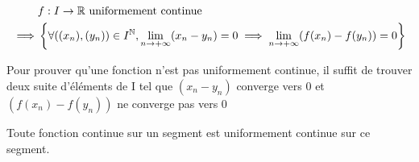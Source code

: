 \begin{prp}
\begin{align*}
            &f : I \to \mathbb{R} \text{ uniformement continue } \\
\implies    &\left \{ \forall ((x_n), (y_n)) \in I^{\mathbb{N}}, \lim\limits_{n \to +\infty} (x_n - y_n) = 0
            \implies \lim\limits_{n \to +\infty} (f(x_n) - f(y_n)) = 0 \right \}
\end{align*}
\end{prp}

\begin{rem}
Pour prouver qu'une fonction n'est pas uniformement continue,
il suffit de trouver deux suite d'éléments de I tel que
$(x_n - y_n)$ converge vers 0 et $(f(x_n) - f(y_n))$ ne converge
pas vers 0
\end{rem}

\begin{thm}[de Heine]
Toute fonction continue sur un segment est uniformement continue sur
ce segment.
\end{thm}


